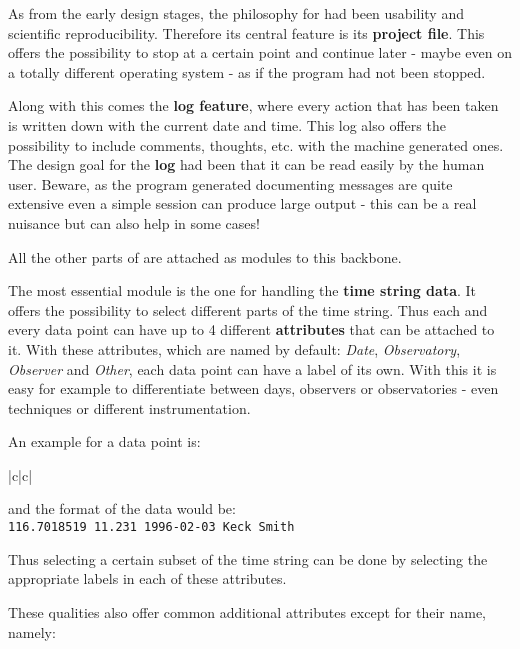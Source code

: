 As from the early design stages, the philosophy for \period had been
usability and scientific reproducibility. Therefore its central feature is 
its {\bf project file}. This offers the possibility to stop at a certain point 
and continue later - maybe even on a totally 
different operating system - as if the program had not been stopped.

Along with this comes the {\bf log feature}, where every action that has been 
taken is written down with the current date and time. This log 
also offers the possibility to include comments, thoughts, etc.
with the machine generated ones.
The design goal for the {\bf log} had been that it can
be read easily by the human user.
Beware, as the program generated documenting messages 
are quite extensive even a simple session can produce large output - 
this can be a real nuisance but can also help in some cases!

All the other parts of \period are attached as modules to this backbone.

The most essential module is the one for handling the {\bf time string data}.
It offers the possibility to select different parts of the time string.
Thus each and every data point can have up to 4 different 
{\bf attributes} that can  be attached to it. 
With these attributes, which are named by default:
{\it Date}, {\it Observatory}, {\it Observer} and {\it Other},
each data point can have a label of its own. With this it is easy 
for example to differentiate between days, 
observers or observatories - even techniques
or different instrumentation.

An example for a data point is:

\begin{tabular}{|c|c|}\hline
{}
\end{tabular}

and the format of the data would be:\\
{\tt 116.7018519     11.231  1996-02-03      Keck    Smith}

Thus selecting a certain subset of the time string can be done 
by selecting the appropriate labels in each of these attributes. 


These qualities also offer common additional attributes except for 
their name, namely:


